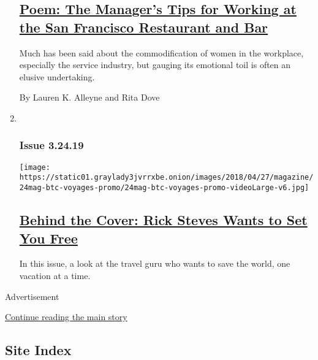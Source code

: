 \begin{enumerate}
  \hypertarget{poem-the-managers-tips-for-working-at-the-san-francisco-restaurant-and-bar}{%
  \subsection{\texorpdfstring{\href{/2019/03/20/magazine/poem-the-managers-tips-for-working-at-the-san-francisco-restaurant-and-bar.html}{Poem:
  The Manager's Tips for Working at the San Francisco Restaurant and
  Bar}}{Poem: The Manager's Tips for Working at the San Francisco Restaurant and Bar}}\label{poem-the-managers-tips-for-working-at-the-san-francisco-restaurant-and-bar}}

  Much has been said about the commodification of women in the
  workplace, especially the service industry, but gauging its emotional
  toil is often an elusive undertaking.

  By Lauren K. Alleyne and Rita Dove
\item ~
  \hypertarget{issue-32419}{%
  \subsubsection{Issue 3.24.19}\label{issue-32419}}

  \texttt{[image: https://static01.graylady3jvrrxbe.onion/images/2018/04/27/magazine/24mag-btc-voyages-promo/24mag-btc-voyages-promo-videoLarge-v6.jpg]}

  \hypertarget{behind-the-cover-rick-steves-wants-to-set-you-free}{%
  \subsection{\texorpdfstring{\href{/2019/03/21/magazine/behind-the-cover-rick-steves-wants-to-set-you-free.html}{Behind
  the Cover: Rick Steves Wants to Set You
  Free}}{Behind the Cover: Rick Steves Wants to Set You Free}}\label{behind-the-cover-rick-steves-wants-to-set-you-free}}

  In this issue, a look at the travel guru who wants to save the world,
  one vacation at a time.
\end{enumerate}

Advertisement

\protect\hyperlink{after-mid1}{Continue reading the main story}

\hypertarget{site-index}{%
\subsection{Site Index}\label{site-index}}

